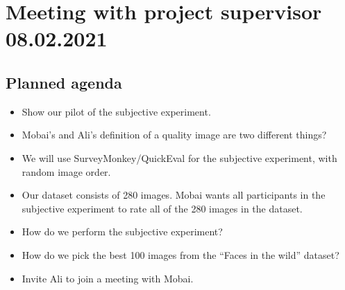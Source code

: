 \newpage

\section*{Meeting with project supervisor 08.02.2021}
\subsection*{Planned agenda}
\begin{itemize}
    \item Show our pilot of the subjective experiment.
    \item Mobai’s and Ali’s definition of a quality image are two different things? 
    \item We will use SurveyMonkey/QuickEval for the subjective experiment, with random image order. 
    \item Our dataset consists of 280 images. Mobai wants all participants in the subjective experiment to rate all of the 280 images in the dataset.
    \item How do we perform the subjective experiment?
    \item How do we pick the best 100 images from the “Faces in the wild” dataset?
    \item Invite Ali to join a meeting with Mobai.
\end{itemize}

